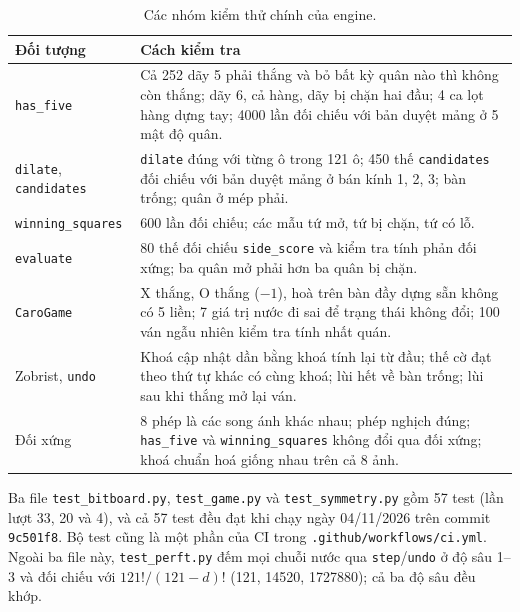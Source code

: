 \begin{table}[H]
  \centering\small
  \caption{Các nhóm kiểm thử chính của engine.}
  \label{tab:kiem-thu}
  \begin{tabularx}{\textwidth}{@{}lX@{}}
    \toprule
    \textbf{Đối tượng} & \textbf{Cách kiểm tra} \\
    \midrule
    \texttt{has\_five} & Cả 252 dãy 5 phải thắng và bỏ bất kỳ quân nào thì không còn thắng; dãy 6, cả hàng, dãy bị chặn hai đầu; 4 ca lọt hàng dựng tay; \num{4000} lần đối chiếu với bản duyệt mảng ở 5 mật độ quân. \\
    \texttt{dilate}, \texttt{candidates} & \texttt{dilate} đúng với từng ô trong 121 ô; 450 thế \texttt{candidates} đối chiếu với bản duyệt mảng ở bán kính 1, 2, 3; bàn trống; quân ở mép phải. \\
    \texttt{winning\_squares} & 600 lần đối chiếu; các mẫu tứ mở, tứ bị chặn, tứ có lỗ. \\
    \texttt{evaluate} & 80 thế đối chiếu \texttt{side\_score} và kiểm tra tính phản đối xứng; ba quân mở phải hơn ba quân bị chặn. \\
    \texttt{CaroGame} & X thắng, O thắng ($-1$), hoà trên bàn đầy dựng sẵn không có 5 liền; 7 giá trị nước đi sai để trạng thái không đổi; 100 ván ngẫu nhiên kiểm tra tính nhất quán. \\
    Zobrist, \texttt{undo} & Khoá cập nhật dần bằng khoá tính lại từ đầu; thế cờ đạt theo thứ tự khác có cùng khoá; lùi hết về bàn trống; lùi sau khi thắng mở lại ván. \\
    Đối xứng & 8 phép là các song ánh khác nhau; phép nghịch đúng; \texttt{has\_five} và \texttt{winning\_squares} không đổi qua đối xứng; khoá chuẩn hoá giống nhau trên cả 8 ảnh. \\
    \bottomrule
  \end{tabularx}
\end{table}

Ba file \texttt{test\_bitboard.py}, \texttt{test\_game.py} và \texttt{test\_symmetry.py} gồm 57 test (lần lượt 33, 20 và 4), và cả 57 test đều đạt khi chạy ngày 04/11/2026 trên commit \texttt{9c501f8}. Bộ test cũng là một phần của CI trong \texttt{.github/workflows/ci.yml}. Ngoài ba file này, \texttt{test\_perft.py} đếm mọi chuỗi nước qua \texttt{step}/\texttt{undo} ở độ sâu 1--3 và đối chiếu với $121!/(121-d)!$ (\num{121}, \num{14520}, \num{1727880}); cả ba độ sâu đều khớp.

